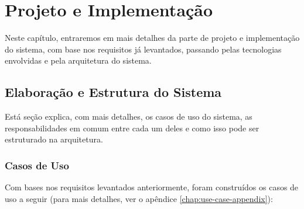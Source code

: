 \chapter{Projeto e Implementação}\label{chap:projeto-implementacao}
Neste capítulo, entraremos em mais detalhes da parte de projeto e implementação do sistema, com base nos requisitos já levantados, passando pelas tecnologias envolvidas e pela arquitetura do sistema.

\section{Elaboração e Estrutura do Sistema}
Está seção explica, com mais detalhes, os casos de uso do sistema, as responsabilidades em comum entre cada um deles e como isso pode ser estruturado na arquitetura.

\subsection{Casos de Uso}
Com bases nos requisitos levantados anteriormente, foram construídos os casos de uso a seguir (para mais detalhes, ver o apêndice \ref{chap:use-case-appendix}):

